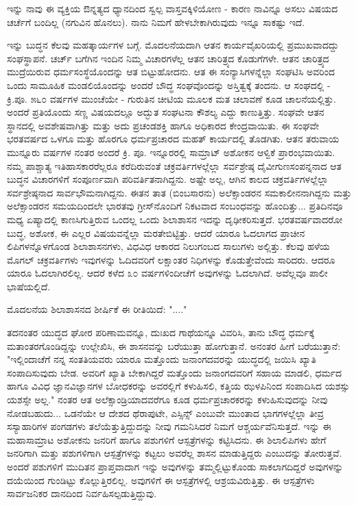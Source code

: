 ಇನ್ನು ನಾವು ಈ ವ್ಯಕ್ತಿಯ ಔನ್ನತ್ಯದ ಧ್ಯಾನದಿಂದ ಸ್ವಲ್ಪ ವಾಸ್ತವಕ್ಕಿಳಿಯೋಣ - ಕಾರಣ ನಾವಿನ್ನೂ ಅಸಲು ವಿಷಯದ ಚರ್ಚೆಗೆ ಬಂದಿಲ್ಲ (ನಗುವಿನ ಹೊನಲು). ನಾನು ನಿಮಗೆ ಹೇಳಬೇಕಾಗಿರುವುದು ಇನ್ನೂ ಸಾಕಷ್ಟು ಇದೆ.

ಇನ್ನು ಬುದ್ಧನ ಕೆಲವು ಮಹತ್ಕಾರ್ಯಗಳ ಬಗ್ಗೆ. ಮೊದಲನೆಯದಾಗಿ ಆತನ ಕಾರ್ಯವೈಖರಿಯಲ್ಲಿ ಪ್ರಮುಖವಾದದ್ದು ಸಂಘಸ್ಥಾಪನೆ. ಚರ್ಚ್ ಬಗೆಗಿನ ಇಂದಿನ ನಿಮ್ಮ ವಿಚಾರಗಳೆಲ್ಲ ಆತನ ಚಾರಿತ್ರ್ಯದ ಕೊಡುಗೆಗಳೇ. ಆತನ ಚಾರಿತ್ರ್ಯದ ಮುದ್ರೆಯಿರುವ ಧರ್ಮಸಂಸ್ಥೆಯೊಂದನ್ನು ಆತ ಬಿಟ್ಟುಹೋದನು. ಆತ ಈ ಸಂನ್ಯಾಸಿಗಳನ್ನೆಲ್ಲಾ ಸಂಘಟಿಸಿ ಅವರಿಂದ ಒಂದು ಸಾಮೂಹಿಕ ಮಂಡಲಿಯೊಂದನ್ನು ಅಂದರೆ ಬೌದ್ಧ ಸಂಘವೊಂದನ್ನು ಅಸ್ತಿತ್ವಕ್ಕೆ ತಂದನು. ಆ ಸಂಘದಲ್ಲಿ - ಕ್ರಿ.ಪೂ. ೫೬೦ ವರ್ಷಗಳ ಮುಂಚೆಯೇ - ಗುರುತಿನ ಚೀಟಿಯ ಮೂಲಕ ಮತ ಚಲಾವಣೆ ಕೂಡ ಚಾಲನೆಯಲ್ಲಿತ್ತು. ಅಂದರೆ ಪ್ರತಿಯೊಂದು ಸಣ್ಣ ವಿಷಯದಲ್ಲೂ ಅದ್ಭುತ ಸಂಘಟನಾ ಕೌಶಲ್ಯ ಎದ್ದು ಕಾಣುತ್ತಿತ್ತು. ಸಂಘವೇ ಆತನ ಸ್ಥಾನದಲ್ಲಿ ಅವಶೇಷವಾಗಿತ್ತು ಮತ್ತು ಅದು ಪ್ರಚಂಡಶಕ್ತಿ ಹಾಗೂ ಅಧಿಕಾರದ ಕೇಂದ್ರವಾಯಿತು. ಈ ಸಂಘವೇ ಭರತವರ್ಷದ ಒಳಗೂ ಮತ್ತು ಹೊರಗೂ ಧರ್ಮಪ್ರಚಾರದ ಮಹತ್ ಕಾರ್ಯದಲ್ಲಿ ತೊಡಗಿತು. ಆತನ ತರುವಾಯ ಮುನ್ನೂರು ವರ್ಷಗಳ ನಂತರ ಅಂದರೆ ಕ್ರಿ. ಪೂ. ಇನ್ನೂರರಲ್ಲಿ ಸಾಮ್ರಾಟ್ ಅಶೋಕನ ಆಳ್ವಿಕೆ ಪ್ರಾರಂಭವಾಯಿತು. ನಮ್ಮ ಪಾಶ್ಚಾತ್ಯ ಇತಿಹಾಸಕಾರರೆಲ್ಲರೂ ಕರೆದಿರುವಂತೆ ಚಕ್ರವರ್ತಿಗಳಲ್ಲೆಲ್ಲಾ ಸರ್ವಶ್ರೇಷ್ಠ ದೈವೀಗುಣಸಂಪನ್ನನಾದ ಆತ ಬುದ್ಧನ ವಿಚಾರಗಳಿಗೆ ಸಂಪೂರ್ಣವಾಗಿ ಪರಿವರ್ತಿತನಾಗಿದ್ದನು. ಅಷ್ಟೇ ಅಲ್ಲ, ಆಗಿನ ಕಾಲದ ಚಕ್ರವರ್ತಿಗಳಲ್ಲೆಲ್ಲಾ ಸರ್ವಶ್ರೇಷ್ಠನಾದ ಸಾರ್ವಭೌಮನಾಗಿದ್ದನು. ಈತನ ತಾತ (ಬಿಂಬಸಾರನು) ಅಲೆಕ್ಸಾಂಡರನ ಸಮಕಾಲೀನನಾಗಿದ್ದನು ಮತ್ತು ಅಲೆಕ್ಸಾಂಡರನ ಸಮಯದಿಂದಲೇ ಭಾರತವು ಗ್ರೀಸ್‌ನೊಂದಿಗೆ ನಿಕಟವಾದ ಸಂಬಂಧವನ್ನು ಹೊಂದಿತ್ತು... ಪ್ರತಿದಿನವೂ ಮಧ್ಯ ಏಷ್ಯಾದಲ್ಲಿ ಕಾಣಸಿಗುತ್ತಿರುವ ಒಂದಲ್ಲ ಒಂದು ಶಿಲಾಶಾಸನ ಇದನ್ನು ದೃಢೀಕರಿಸುತ್ತದೆ. ಭರತವರ್ಷವಾದರೋ ಬುದ್ಧ, ಅಶೋಕ, ಈ ಎಲ್ಲರ ವಿಷಯವನ್ನೆಲ್ಲಾ ಮರತೇಬಿಟ್ಟಿತ್ತು. ಆದರೆ ಯಾರೂ ಓದಲಾಗದ ಪ್ರಾಚೀನ ಲಿಪಿಗಳನ್ನೊಳಗೊಂಡ ಶಿಲಾಶಾಸನಗಳು, ವಿಧವಿಧ ಆಕಾರದ ನಿಲುಗಂಬದ ಸಾಲುಗಳು ಅಲ್ಲಿತ್ತು. ಕೆಲವು ಹಳೆಯ ಮೊಗಲ್ ಚಕ್ರವರ್ತಿಗಳು ಇವುಗಳನ್ನು ಓದಿದವರಿಗೆ ಲಕ್ಷಾಂತರ ನಿಧಿಗಳನ್ನು ಕೊಡುತ್ತೇವೆಂದು ಸಾರಿದರು. ಆದರೂ ಯಾರೂ ಓದಲಾಗಿರಲಿಲ್ಲ. ಆದರೆ ಕಳೆದ ೩೦ ವರ್ಷಗಳಿಂದೀಚೆಗೆ ಅವುಗಳನ್ನು ಓದಲಾಗಿದೆ. ಅವೆಲ್ಲವೂ ಪಾಲೀ ಭಾಷೆಯಲ್ಲಿದೆ.

ಮೊದಲನೆಯ ಶಿಲಾಶಾಸನದ ಶೀರ್ಷಿಕೆ ಈ ರೀತಿಯಿದೆ: "...."

ತದನಂತರ ಯುದ್ಧದ ಘೋರ ಪರಿಣಾಮವನ್ನೂ, ದುಃಖದ ಗಾಥೆಯನ್ನೂ ವಿವರಿಸಿ, ತಾನು ಬೌದ್ಧ ಧರ್ಮಕ್ಕೆ ಮತಾಂತರಗೊಂಡಿದ್ದನ್ನು ಉಲ್ಲೇಖಿಸಿ, ಈ ಶಾಸನವನ್ನು ಬರೆಯುತ್ತಾ ಹೋಗುತ್ತಾನೆ. ಅನಂತರ ಹೀಗೆ ಬರೆಯುತ್ತಾನೆ: "ಇಲ್ಲಿಂದಾಚೆಗೆ ನನ್ನ ಸಂತತಿಯವರು ಯಾರೂ ಮತ್ತೊಂದು ಜನಾಂಗದವರನ್ನು ಯುದ್ಧದಲ್ಲಿ ಜಯಿಸಿ ಖ್ಯಾತಿ ಸಂಪಾದಿಸುವುದು ಬೇಡ. ಅವರಿಗೆ ಖ್ಯಾತಿ ಬೇಕಾಗಿದ್ದರೆ ಮತ್ತೊಂದು ಜನಾಂಗದವರಿಗೆ ಸಹಾಯ ಮಾಡಲಿ, ಧರ್ಮದ ಹಾಗೂ ವಿವಿಧ ಜ್ಞಾನವಿಜ್ಞಾನಗಳ ಬೋಧಕರನ್ನು ಅವರಲ್ಲಿಗೆ ಕಳುಹಿಸಲಿ, ಕತ್ತಿಯ ಝಳಪಿನಿಂದ ಸಂಪಾದಿಸಿದ ಯಶಸ್ಸು ಯಶಸ್ಸೇ ಅಲ್ಲ." ನಂತರ ಆತ ಅಲೆಕ್ಸಾಂಡ್ರಿಯಾದವರೆಗೂ ಕೂಡ ಧರ್ಮಪ್ರಚಾರಕರನ್ನು ಕಳುಹಿಸುವುದನ್ನು ನೀವು ನೋಡಬಹುದು... ಒಡನೆಯೇ ಆ ದೇಶದ ಥೆರಾಪುಟೇ, ಎಸ್ಸಿನ್ಸ್ ಎಂಬುವೇ ಮುಂತಾದ ಭಾಗಗಳಲ್ಲೆಲ್ಲಾ ತೀವ್ರ ಸಸ್ಯಾಹಾರಿಗಳ ಪಂಗಡಗಳು ತಲೆಯೆತ್ತುತ್ತಿದ್ದುದನ್ನು ನೀವು ಗಮನಿಸಿದರೆ ನಿಮಗೆ ಆಶ್ಚರ್ಯವೆನಿಸುತ್ತದೆ. ಇನ್ನು ಈ ಮಹಾಸಾಮ್ರಾಟ ಅಶೋಕನು ಜನರಿಗೆ ಹಾಗೂ ಪಶುಗಳಿಗೆ ಆಸ್ಪತ್ರೆಗಳನ್ನು ಕಟ್ಟಿಸಿದನು. ಈ ಶಿಲಾಲಿಪಿಗಳು ಹೇಗೆ ಜನರಿಗಾಗಿ ಮತ್ತು ಪಶುಗಳಿಗಾಗಿ ಆಸ್ಪತ್ರೆಗಳನ್ನು ಕಟ್ಟಲು ಅವರೆಲ್ಲ ಶಾಸನ ಮಾಡುತ್ತಿದ್ದರು ಎಂಬುದನ್ನು ತೋರುತ್ತವೆ. ಅಂದರೆ ಪಶುಗಳಿಗೆ ಮುದಿತನ ಪ್ರಾಪ್ತವಾದಾಗ ಇನ್ನು ಅವುಗಳನ್ನು ತಮ್ಮಲ್ಲಿಟ್ಟುಕೊಂಡು ಸಾಕಲಾಗದಿದ್ದರೆ ಅವುಗಳನ್ನು ದಯೆಯಿಂದ ಗುಂಡಿಟ್ಟು ಕೊಲ್ಲುತ್ತಿರಲಿಲ್ಲ. ಅವುಗಳಿಗೆ ಈ ಆಸ್ಪತ್ರೆಗಳಲ್ಲಿ ಆಶ್ರಯವಿರುತ್ತಿತ್ತು. ಈ ಆಸ್ಪತ್ರೆಗಳು ಸಾರ್ವಜನಿಕರ ದಾನದಿಂದ ನಿರ್ವಹಿಸಲ್ಪಡುತ್ತಿದ್ದುವು.

